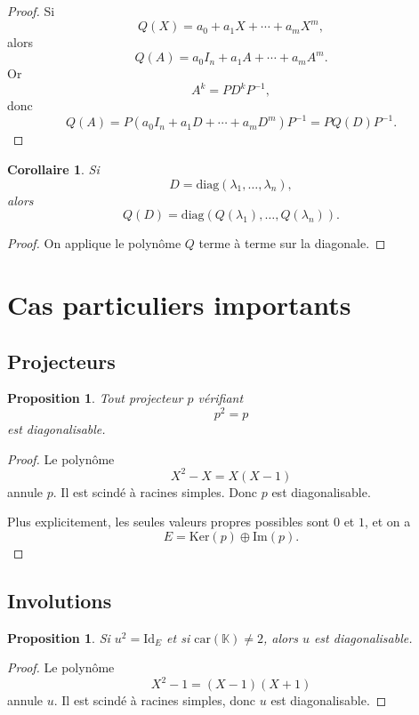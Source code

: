 \documentclass[11pt,a4paper]{article}
\newtheorem{proposition}[definition]{Proposition}
\newtheorem{corollaire}[definition]{Corollaire}
\theoremstyle{remark}
\newcommand{\K}{\mathbb{K}}
\newcommand{\Ker}{\mathrm{Ker}}
\newcommand{\Img}{\mathrm{Im}}
\newcommand{\id}{\mathrm{Id}}
\newcommand{\diag}{\mathrm{diag}}
\begin{document}
\begin{proof}
Si
\[
Q(X)=a_0+a_1X+\cdots+a_mX^m,
\]
alors
\[
Q(A)=a_0I_n+a_1A+\cdots+a_mA^m.
\]
Or
\[
A^k=PD^kP^{-1},
\]
donc
\[
Q(A)=P(a_0I_n+a_1D+\cdots+a_mD^m)P^{-1}=PQ(D)P^{-1}.
\]
\end{proof}

\begin{corollaire}
Si
\[
D=\diag(\lambda_1,\dots,\lambda_n),
\]
alors
\[
Q(D)=\diag(Q(\lambda_1),\dots,Q(\lambda_n)).
\]
\end{corollaire}

\begin{proof}
On applique le polynôme \(Q\) terme à terme sur la diagonale.
\end{proof}

\section{Cas particuliers importants}

\subsection{Projecteurs}

\begin{proposition}
Tout projecteur \(p\) vérifiant
\[
p^2=p
\]
est diagonalisable.
\end{proposition}

\begin{proof}
Le polynôme
\[
X^2-X=X(X-1)
\]
annule \(p\). Il est scindé à racines simples. Donc \(p\) est diagonalisable.

Plus explicitement, les seules valeurs propres possibles sont \(0\) et \(1\), et on a
\[
E=\Ker(p)\oplus \Img(p).
\]
\end{proof}

\subsection{Involutions}

\begin{proposition}
Si \(u^2=\id_E\) et si \(\mathrm{car}(\K)\neq 2\), alors \(u\) est diagonalisable.
\end{proposition}

\begin{proof}
Le polynôme
\[
X^2-1=(X-1)(X+1)
\]
annule \(u\). Il est scindé à racines simples, donc \(u\) est diagonalisable.
\end{proof}
\end{document}
